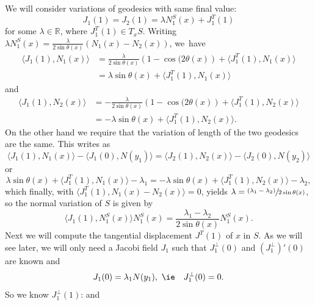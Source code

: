 \documentclass[JEP,XML,SOM,Unicode,NoFloatCountersInSection,published]{cedram}
\newcommand{\psfrac}[2]{\sfrac{(#1)}{#2}}
\theoremstyle{plain}
\theoremstyle{definition}
\newcommand{\RR}{{\mathbb R}}
\let\di\displaystyle
\let\f\frac
\let\l\lambda
\begin{document}
We will consider variations of geodesics with same final value:
\begin{equation}
J_1(1)=J_2(1)=\l N_1^S(x)+ J_1^T(1)
\end{equation}
for some $\l\in \RR$, where $J_1^T(1)\in T_xS$. Writing $\l N_1^S(x)=\f{\l}{2\sin\theta(x)} (N_1(x)-N_2(x))$, we~have
\begin{equation}
\begin{split}
\langle J_1(1), N_1(x)\rangle &= \f{\l}{2\sin\theta(x)}\left(1-\cos(2\theta(x)\right)+ \langle J_1^T(1), N_1(x)\rangle\\&=\l\sin\theta(x)+ \langle J_1^T(1), N_1(x)\rangle
\end{split}
\end{equation}
and
\begin{equation}
\begin{split}
\langle J_1(1), N_2(x)\rangle &= -\f{\l}{2\sin\theta(x)}\left(1-\cos(2\theta(x)\right)+ \langle J_1^T(1), N_{{2}}(x)\rangle\\&=-\l\sin\theta(x)+ \langle J_1^T(1), N_2(x)\rangle.
\end{split}
\end{equation}
On the other hand we require that the variation of length of the two geodesics are the same. This writes as
\begin{equation}
\langle J_1(1), N_1(x)\rangle -\langle J_1(0), N(y_1)\rangle=\langle J_2(1), N_2(x)\rangle -\langle J_2(0), N(y_2)\rangle
\end{equation}
or
\begin{equation}
\l\sin\theta(x)+ \langle J_1^T(1), N_1(x)\rangle-\l_1=-\l\sin\theta(x)+\langle J_1^T(1), N_2(x)\rangle-\l_2,
\end{equation}
which finally, with $\langle J_1^T(1), N_1(x)-N_2(x)\rangle=0$, yields $\di \l=\psfrac{\l_1-\l_2}{2\sin\theta(x)}$, so the normal variation of $S$ is given by
\begin{equation}
\label{3.18}
\langle J_1(1), N_1^S(x)\rangle N_1^S(x)=\f{\l_1-\l_2}{2\sin\theta(x)}N_1^S(x).
\end{equation}
Next we will compute the tangential displacement $J^T(1)$ of $x$ in $S$. As we will see later, we will only need a Jacobi field $J_1$ such that $J_1^\perp(0)$
and $(J_1^\perp)'(0)$ are known and
\begin{equation}
J_1(0)=\l_1N(y_1), \ \hbox{{\ie}}\quad J_1^\perp(0)=0.
\end{equation}
So we know $J_1^\perp(1)$: and
\end{document}
